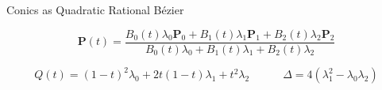 \documentclass[aspectratio=169, 10pt]{beamer}
\begin{document}
\begin{frame}[t]{Conics as Quadratic Rational Bézier}




        \[
        \mathbf{P}(t) = \frac{B_0(t) \lambda_0 \mathbf{P}_0 + B_1(t) \lambda_1\mathbf{P}_1 + B_2(t) \lambda_2 \mathbf{P}_2}{B_0(t) \lambda_0 + B_1(t) \lambda_1 + B_2(t) \lambda_2}
        \]

        {
        \[
        Q(t) = (1-t)^2 \lambda_0 + 2t(1-t) \lambda_1 + t^2 \lambda_2
        \qquad \quad \Delta = 4(\lambda_1^2 - \lambda_0 \lambda_2)
        \]
        }

        



\end{frame}
\end{document}
